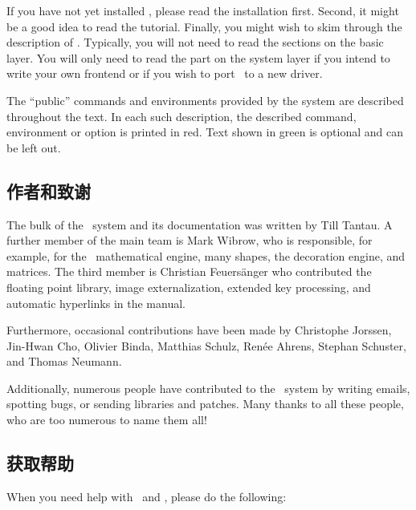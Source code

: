 If you have not yet installed \tikzname, please read the installation
first. Second, it might be a good idea to read the tutorial. Finally,
you might wish to skim through the description of \tikzname. Typically,
you will not need to read the sections on the basic layer. You will
only need to read the part on the system layer if you intend to write
your own frontend or if you wish to port \pgfname\ to a new driver.

The ``public'' commands and environments provided by the system
are described throughout the text. In each such description, the
described command, environment or option is printed in red. Text shown
in green is optional and can be left out.


\subsection{作者和致谢}
\label{section-authors}

The bulk of the \pgfname\ system and its documentation was written by
Till Tantau. A further member of the main team is Mark Wibrow, who
is responsible, for example, for the \pgfname\ mathematical engine,
many shapes, the decoration engine, and matrices. The third member is
Christian Feuers\"anger who contributed the floating point library,
image externalization, extended key processing, and automatic hyperlinks
in the manual.

Furthermore, occasional contributions have been made by Christophe
Jorssen, Jin-Hwan Cho, Olivier Binda, Matthias Schulz, Ren\'ee Ahrens,
Stephan Schuster, and Thomas Neumann.

Additionally, numerous people have contributed to the \pgfname\ system
by writing emails, spotting bugs, or sending libraries and patches.
Many thanks to all these people, who are too numerous to name them
all!



\subsection{获取帮助}

When you need help with \pgfname\ and \tikzname, please do the
following:

